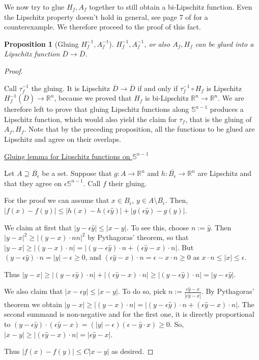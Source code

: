 \documentclass[english,a4paper,9pt,oneside]{scrbook}	%
\theoremstyle{break}
\newtheorem{prop}[equation]{Proposition}
\newenvironment{mproof}[1][\proofname]{%
  \begin{proof}[#1]$ $\par\nobreak\ignorespaces
}{%
  \end{proof}
}
\renewcommand*{\proofname}{Proof}
\theoremstyle{remark}
\newcommand{\mR}{\mathbb{R}}
\newcommand{\mS}{\mathbb{S}^{n-1}}
\newcommand{\yh}{\hat{y}}
\newcommand{\eps}{\epsilon}
\begin{document}
We now try to glue $H_f, A_f$ together to still obtain a bi-Lipschitz function. Even the Lipschitz property doesn't hold in general, see page 7 of \cite{weaver} for a counterexample. We therefore proceed to the proof of this fact.

\begin{prop}[Gluing $H_f^{-1}, A_f^{-1}$]
\label{prop:gluing}
$H_f^{-1}, A_f^{-1}$, or also $A_f, H_f$ can be glued into a Lipschitz function $\overline{D}\rightarrow\overline{D}$.
\end{prop}
\begin{mproof}

Call $\tau_f^{-1}$ the gluing. It is Lipschitz $\overline{D}\rightarrow\overline{D}$ if and only if $\tau_f^{-1}\circ H_f$ is Lipschitz $H_f^{-1}(\overline{D})\rightarrow\mR^n$, because we proved that $H_f$ is bi-Lipschitz $\mR^n \rightarrow \mR^n$.
We are therefore left to prove that gluing Lipschitz functions along $\mS$ produces a Lipschitz function, which would also yield the claim for $\tau_f$, that is the gluing of $A_f, H_f$. Note that by the preceding proposition, all the functions to be glued are Lipschitz and agree on their overlaps.

\underline{Gluing lemma for Lipschitz functions on $\mS$}

Let $A\supseteq \overline{B_\eps}$ be a set. Suppose that $g:A\rightarrow\mR^n$ and $h:\overline{B_\eps}\rightarrow\mR^n$ are Lipschitz and that they agree on $\eps \mS$. Call $f$ their gluing.

For the proof we can assume that $x \in B_\eps$, $y \in A \setminus \overline{B_\eps}$.
Then, $|f(x)-f(y)|\leq |h(x)-h(\eps \yh)|+|g(\eps \yh)-g(y)|$.

We claim at first that $|y-\eps \yh|\leq  |x-y|$. To see this, choose $n:=\yh$. Then $|y-x|^2 \geq |(y-x)\cdot n n|^2$ by Pythagoras' theorem, so that $|y-x|\geq |(y-x)\cdot n| = |(y-\eps \yh)\cdot n + (\eps \yh -x)\cdot n|$. But $(y-\eps \yh)\cdot n=|y|-\eps \geq 0$, and $(\eps \yh -x)\cdot n = \eps - x\cdot n\geq 0 $ as $x\cdot n \leq |x|\leq \eps$.

Thus  $|y-x|\geq |(y-\eps \yh)\cdot n| + |(\eps \yh -x)\cdot n|\geq  |(y-\eps \yh)\cdot n|=|y-\eps \yh|$.

We also claim that $|x-\eps \yh|\leq |x-y|$. To do so, pick $n:=\frac{\eps\yh -x}{|\eps\yh-x|}$. By Pythagoras' theorem we obtain $|y-x|\geq |(y-x)\cdot n|=|(y-\eps \yh)\cdot n +(\eps \yh -x)\cdot n|$. The second summand is non-negative and for the first one, it is directly proportional to $(y-\eps \yh)\cdot(\eps \yh-x)=(|y|-\eps)(\eps-\yh\cdot x)\geq 0$. So, $|x-y|\geq |(\eps \yh -x)\cdot n|=|\eps \yh -x|$.

Thus $ |f(x)-f(y)|\leq C|x-y|$ as desired.
\end{mproof}
\end{document}
